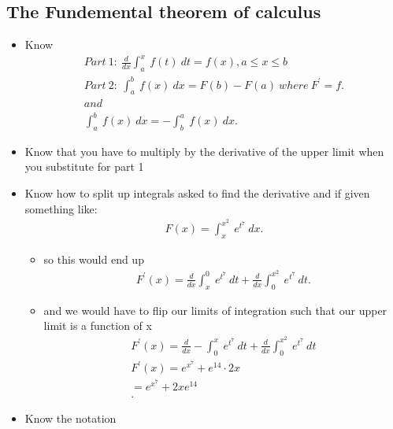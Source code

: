 \documentclass{report}
\begin{document}
      \subsection{The Fundemental theorem of calculus}
      \begin{itemize}
        \item Know
          \begin{align*}
            Part\ 1:\ \frac{d}{dx}\int_{a}^{x}\ f(t)\ dt  = f(x), a \leq x \leq b         \\
            Part\ 2:\ \int_{a}^{b}\ f(x)\ dx = F(b) - F(a)\ where\ F^{\prime} = f. \\
            and \\
            \int_{a}^{b}\ f(x)\ dx = -\int_{b}^{a}\ f(x)\ dx
        .\end{align*}
        \smallbreak \noindent
        \item Know that you have to multiply by the derivative of the upper limit when you substitute for part 1
        \item Know how to split up integrals asked to find the derivative and if given something like:
          \begin{align*}
            F(x) = \int_{x}^{x^{2}}\ e^{t^{7}}\ dx
          .\end{align*}
          \begin{itemize}
            \item so this would end up
              \begin{align*}
                F^{\prime}(x) = \frac{d}{dx}\int_{x}^{0}\ e^{t^{7}}\ dt + \frac{d}{dx}\int_{0}^{x^{2}}\ e^{t^{7}}\ dt
              .\end{align*}
            \item and we would have to flip our limits of integration such that our upper limit is a function of x
              \begin{align*}
                F^{\prime}(x) = \frac{d}{dx}-\int_{0}^{x}\ e^{t^{7}}\ dt + \frac{d}{dx}\int_{0}^{x^{2}}\ e^{t^{7}}\ dt \\
                F^{\prime}(x) = e^{x^{7}} + e^{14} \cdot 2x \\
                 = e^{x^{7}} + 2xe^{14}\\
              .\end{align*}
          \end{itemize}
        \smallbreak \noindent
      \item Know the notation
        \begin{itemize}

\end{itemize}
\end{itemize}
\end{document}
